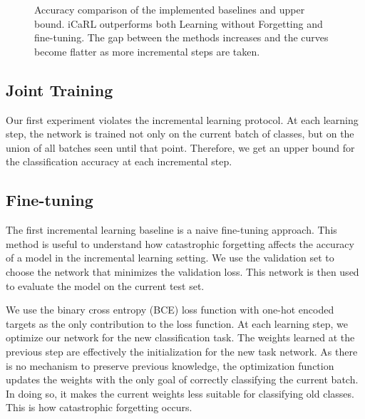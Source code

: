\documentclass[10pt,twocolumn,letterpaper]{article}
\begin{document}
\begin{figure}
\caption{Accuracy comparison of the implemented baselines and upper bound. iCaRL outperforms both Learning without Forgetting and fine-tuning. The gap between the methods increases and the curves become flatter as more incremental steps are taken.}
\label{fig:experiments:plot}
\end{figure}

\subsection{Joint Training}
Our first experiment violates the incremental learning protocol. At each learning step, the network is trained not only on the current batch of classes, but on the union of all batches seen until that point. Therefore, we get an upper bound for the classification accuracy at each incremental step.

\subsection{Fine-tuning}
The first incremental learning baseline is a naive fine-tuning approach. This method is useful to understand how catastrophic forgetting affects the accuracy of a model in the incremental learning setting. We use the validation set to choose the network that minimizes the validation loss. This network is then used to evaluate the model on the current test set.

We use the binary cross entropy (BCE) loss function with one-hot encoded targets as the only contribution to the loss function. At each learning step, we optimize our network for the new classification task. The weights learned at the previous step are effectively the initialization for the new task network. As there is no mechanism to preserve previous knowledge, the optimization function updates the weights with the only goal of correctly classifying the current batch. In doing so, it makes the current weights less suitable for classifying old classes. This is how catastrophic forgetting occurs.
\end{document}
